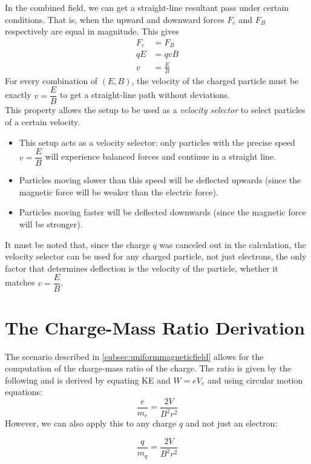 \documentclass[a4paper,12pt]{article}
\let\oldsection\section
\renewcommand\section{\clearpage\oldsection}
\newcommand{\lb}{\\[8pt]}
\begin{document}
In the combined field, we can get a straight-line resultant pass under certain conditions. That is, when the upward and downward forces $F_e$ and $F_B$ respectively are equal in magnitude. This gives \begin{align*}
  F_e & = F_B         \\
  qE  & = qvB         \\
  v   & = \frac{E}{B}
\end{align*}
For every combination of $(E, B)$, the velocity of the charged particle must be exactly $v = \dfrac{E}{B}$ to get a straight-line path without deviations.\lb
This property allows the setup to be used as a \textit{velocity selector} to select particles of a certain velocity.
\begin{itemize}
  \item This setup acts as a velocity selector: only particles with the precise speed $v = \dfrac{E}{B}$ will experience balanced forces and continue in a straight line.
  \item Particles moving slower than this speed will be deflected upwards (since the magnetic force will be weaker than the electric force).
  \item Particles moving faster will be deflected downwards (since the magnetic force will be stronger).
\end{itemize}
It must be noted that, since the charge $q$ was canceled out in the calculation, the velocity selector can be used for any charged particle, not just electrons, the only factor that determines deflection is the velocity of the particle, whether it matches $v = \dfrac{E}{B}$.


\section{The Charge-Mass Ratio Derivation}
The scenario described in \cref{subsec:uniformmagneticfield} allows for the computation of the charge-mass ratio of the charge. The ratio is given by the following and is derived by equating KE and $W = eV_e$ and using circular motion equations:
\begin{equation}
  \frac{e}{m_e} = \frac{2V}{B^2r^2}
\end{equation}
However, we can also apply this to any charge $q$ and not just an electron:

\begin{equation}
  \frac{q}{m_q} = \frac{2V}{B^2r^2}
\end{equation}
\end{document}
